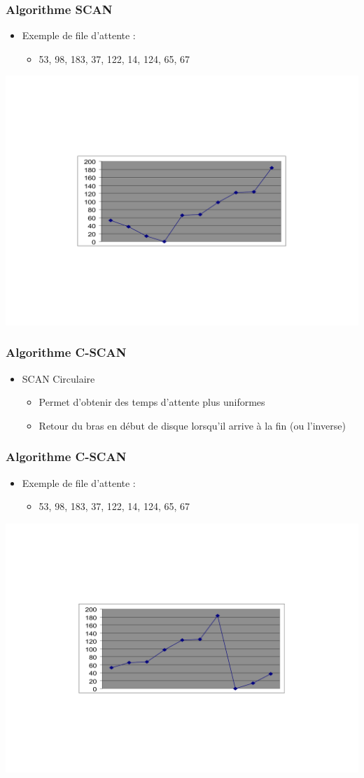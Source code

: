 \begin{frame}
\frametitle{Algorithme SCAN}
\begin{itemize}
\item Exemple de file d'attente :
\begin{itemize}
\item 53, 98, 183, 37, 122, 14, 124, 65, 67
\end{itemize}
\end{itemize}
\includegraphics[width=.8\textwidth]{../illustration/prog_disque_scan.pdf}
\end{frame}

\begin{frame}
\frametitle{Algorithme C-SCAN}
\begin{itemize}
\item SCAN Circulaire
\begin{itemize}
\item Permet d'obtenir des temps d'attente plus uniformes
\item Retour du bras en début de disque lorsqu'il arrive à la fin (ou l'inverse)
\end{itemize}
\end{itemize}
\end{frame}

\begin{frame}
\frametitle{Algorithme C-SCAN}
\begin{itemize}
\item Exemple de file d'attente :
\begin{itemize}
\item 53, 98, 183, 37, 122, 14, 124, 65, 67
\end{itemize}
\end{itemize}
\includegraphics[width=.8\textwidth]{../illustration/prog_disque_cscan.pdf}
\end{frame}

